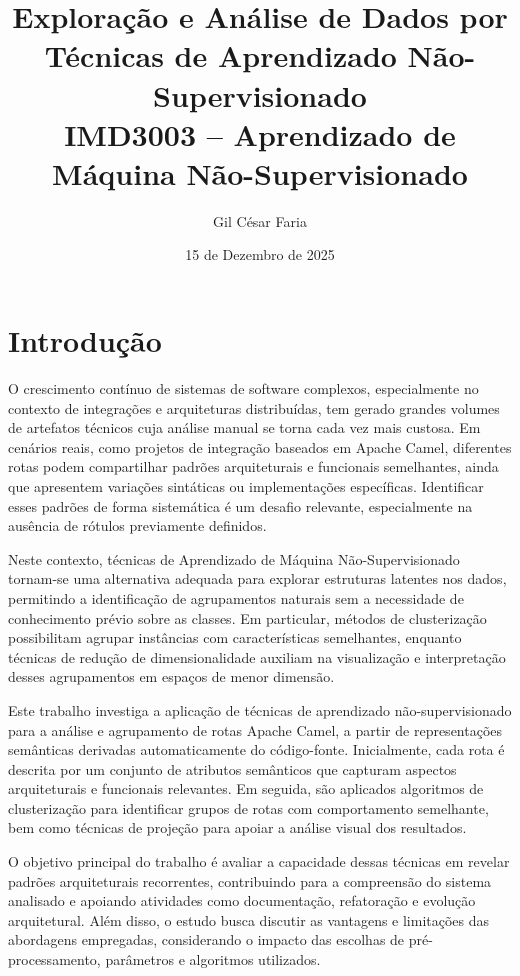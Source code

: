 \documentclass[12pt,a4paper]{article}
\title{
    \textbf{Exploração e Análise de Dados por Técnicas de Aprendizado Não-Supervisionado}\\
    \vspace{0.3cm}
    \large IMD3003 – Aprendizado de Máquina Não-Supervisionado
}
\author{
    Gil César Faria
}
\date{15 de Dezembro de 2025}
\begin{document}
\maketitle

\section{Introdução}

O crescimento contínuo de sistemas de software complexos, especialmente no contexto de integrações e arquiteturas distribuídas, tem gerado grandes volumes de artefatos técnicos cuja análise manual se torna cada vez mais custosa. Em cenários reais, como projetos de integração baseados em Apache Camel, diferentes rotas podem compartilhar padrões arquiteturais e funcionais semelhantes, ainda que apresentem variações sintáticas ou implementações específicas. Identificar esses padrões de forma sistemática é um desafio relevante, especialmente na ausência de rótulos previamente definidos.

Neste contexto, técnicas de Aprendizado de Máquina Não-Supervisionado tornam-se uma alternativa adequada para explorar estruturas latentes nos dados, permitindo a identificação de agrupamentos naturais sem a necessidade de conhecimento prévio sobre as classes. Em particular, métodos de clusterização possibilitam agrupar instâncias com características semelhantes, enquanto técnicas de redução de dimensionalidade auxiliam na visualização e interpretação desses agrupamentos em espaços de menor dimensão.

Este trabalho investiga a aplicação de técnicas de aprendizado não-supervisionado para a análise e agrupamento de rotas Apache Camel, a partir de representações semânticas derivadas automaticamente do código-fonte. Inicialmente, cada rota é descrita por um conjunto de atributos semânticos que capturam aspectos arquiteturais e funcionais relevantes. Em seguida, são aplicados algoritmos de clusterização para identificar grupos de rotas com comportamento semelhante, bem como técnicas de projeção para apoiar a análise visual dos resultados.

O objetivo principal do trabalho é avaliar a capacidade dessas técnicas em revelar padrões arquiteturais recorrentes, contribuindo para a compreensão do sistema analisado e apoiando atividades como documentação, refatoração e evolução arquitetural. Além disso, o estudo busca discutir as vantagens e limitações das abordagens empregadas, considerando o impacto das escolhas de pré-processamento, parâmetros e algoritmos utilizados.
\end{document}
